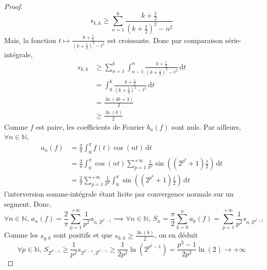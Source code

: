 \begin{proof}
		\[ s_{k,k} \geq \sum_{n=1}^k \frac{k + \frac{1}{2}}{(k + \frac{1}{2})^2 - n^2} \]
		Mais, la fonction $t \mapsto \frac{k + \frac{1}{2}}{(k + \frac{1}{2})^2 - t^2}$ est croissante. Donc par comparaison série-intégrale,
		\begin{align*}
			s_{k,k} &\geq \sum_{n=1}^k \int_{n-1}^n \frac{k + \frac{1}{2}}{(k + \frac{1}{2})^2 - t^2} \, \mathrm{d}t \\
			&= \int_0^k \frac{k + \frac{1}{2}}{(k + \frac{1}{2})^2 - t^2} \, \mathrm{d}t \\
			&= \frac{\ln(4k+3)}{2} \\
			&\geq \frac{\ln(k)}{2}
		\end{align*}
		Comme $f$ est paire, les coefficients de Fourier $b_n(f)$ sont nuls. Par ailleurs, $\forall n \in \mathbb{N}$,
		\begin{align*}
			a_n(f) &= \frac{2}{\pi} \int_0^{\pi} f(t) \cos(nt) \, \mathrm{d}t \\
			&= \frac{2}{\pi} \int_0^{\pi} \cos(nt) \sum_{p=1}^{+\infty} \frac{1}{p^2} \sin \left( (2^{p^3} + 1) \frac{t}{2} \right) \, \mathrm{d}t \\
			&= \frac{2}{\pi} \sum_{p=1}^{+\infty} \frac{1}{p^2} \int_0^{\pi} \sin \left( (2^{p^3} + 1) \frac{t}{2} \right) \, \mathrm{d}t
		\end{align*}
		l'interversion somme-intégrale étant licite par convergence normale sur un segment. Donc,
		\[ \forall n \in \mathbb{N}, \, a_n(f) = \frac{2}{\pi} \sum_{p=1}^{+\infty} \frac{1}{p^2} a_{n,2^{p^3 - 1}} \implies \forall n \in \mathbb{N}, \, S_n = \frac{\pi}{2} \sum_{k=0}^{n} a_k(f) = \sum_{p=1}^{+\infty} \frac{1}{p^2} s_{n,2^{p^3 - 1}} \]
		Comme les $s_{q,k}$ sont positifs et que $s_{k,k} \geq \frac{\ln(k)}{2}$, on en déduit
		\[ \forall p \in \mathbb{N}, \, S_{2^{p^3 - 1}} \geq \frac{1}{p^2} s_{2^{p^3 - 1}, 2^{p^3 - 1}} \geq \frac{1}{2p^2} \ln(2^{p^3 - 1}) = \frac{p^3 - 1}{2 p^2} \ln(2) \longrightarrow +\infty \]
	\end{proof}

